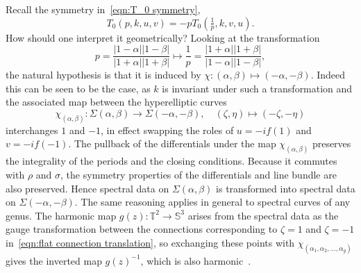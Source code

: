 \documentclass{article}
\numberwithin{equation}{section}
\numberwithin{figure}{section}
\newcommand{\labelthis}[1]{\addtocounter{equation}{1}\tag{\theequation}\label{#1}}
\newcommand{\bra}[1]{\left(#1\right)}
\newcommand{\abs}[1]{\left|#1\right|}
\newcommand{\iu}{i}
\renewcommand{\S}{\mathbb{S}}
\begin{document}
Recall the symmetry in~\eqref{eqn:T_0 symmetry},
\[
T_0(p,k,u,v) = -p T_0\bra{ \tfrac{1}{p}, k, v, u }.
\]
How should one interpret it geometrically? Looking at the transformation
\[
p = \frac{\abs{1-\alpha}\abs{1-\beta}}{\abs{1+\alpha}\abs{1+\beta}}
\mapsto \frac{1}{p} = \frac{\abs{1+\alpha}\abs{1+\beta}}{\abs{1-\alpha}\abs{1-\beta}},
\]
the natural hypothesis is that it is induced by $\chi:(\alpha,\beta)\mapsto (-\alpha,-\beta)$.
Indeed this can be seen to be the case, as $k$ is invariant under such a transformation and the associated map between the hyperelliptic curves
\[
\chi_{(\alpha,\beta)}: \Sigma(\alpha,\beta) \to \Sigma(-\alpha,-\beta),
\quad (\zeta, \eta) \mapsto (-\zeta,-\eta)
\]
interchanges $1$ and $-1$, in effect swapping the roles of $u = -\iu f(1)$ and $v = -\iu f(-1)$. The pullback of the differentials under the map $\chi_{(\alpha,\beta)}$ preserves the integrality of the periods and the closing conditions. Because it commutes with $\rho$ and $\sigma$, the symmetry properties of the differentials and line bundle are also preserved. Hence spectral data on $\Sigma(\alpha,\beta)$ is transformed into spectral data on $\Sigma(-\alpha,-\beta)$.
The same reasoning applies in general to spectral curves of any genus.
The harmonic map $g(z) : \mathbb{T}^2 \to \S^3$ arises from the spectral data as the gauge transformation between the connections corresponding to $\zeta=1$ and $\zeta=-1$ in~\eqref{eqn:flat connection translation}, so exchanging these points with $\chi_{(\alpha_1,\alpha_2,\dots,\alpha_g)}$ gives the inverted map $g(z)^{-1}$, which is also harmonic~\cite[Prop~8.2]{Uhlenbeck1989}.
\end{document}
